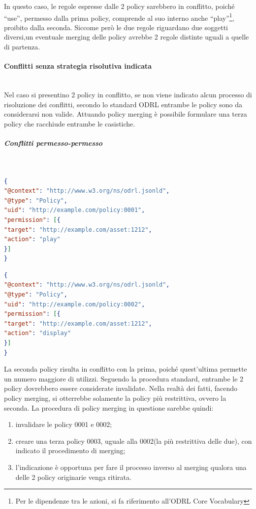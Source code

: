 \documentclass[12pt,a4paper,twoside]{book}
\begin{document}
In questo caso, le regole espresse dalle 2 policy sarebbero in conflitto, poiché ``use'', permesso dalla prima policy, comprende al suo interno anche ``play''\footnote{Per le dipendenze tra le azioni, si fa riferimento all'ODRL Core Vocabulary}, proibito dalla seconda. Siccome però le due regole riguardano due soggetti diversi,un eventuale merging delle policy avrebbe 2 regole distinte uguali a quelle di partenza.
\paragraph{Conflitti senza strategia risolutiva indicata}\label{noStrat}\mbox{}\\
Nel caso si presentino 2 policy in conflitto, se non viene indicato alcun processo di risoluzione dei conflitti, secondo lo standard ODRL entrambe le policy sono da considerarsi non valide. Attuando policy merging è possibile formulare una terza policy che racchiude entrambe le casistiche.
\subparagraph{Conflitti permesso-permesso}\label{permperm}\mbox{}\\
\begin{lstlisting}[language=json,firstnumber=1,caption={La policy 0001 permette un qualsiasi utilizzo dell'asset 1212 a chiunque},captionpos=b]
{
"@context": "http://www.w3.org/ns/odrl.jsonld",
"@type": "Policy",
"uid": "http://example.com/policy:0001",
"permission": [{
"target": "http://example.com/asset:1212",
"action": "play"
}]
}
\end{lstlisting}
\begin{lstlisting}[language=json,firstnumber=1,caption={La policy 0002 permette la riproduzione dell'asset 1212 a chiunque},captionpos=b]
{
"@context": "http://www.w3.org/ns/odrl.jsonld",
"@type": "Policy",
"uid": "http://example.com/policy:0002",
"permission": [{
"target": "http://example.com/asset:1212",
"action": "display"
}]
}
\end{lstlisting}
La seconda policy risulta in conflitto con la prima, poiché quest'ultima permette un numero maggiore di utilizzi. Seguendo la procedura standard, entrambe le 2 policy dovrebbero essere considerate invalidate. Nella realtà dei fatti, facendo policy merging, si otterrebbe solamente la policy più restrittiva, ovvero la seconda. La procedura di policy merging in questione sarebbe quindi: 
\begin{enumerate}
	\item invalidare le policy 0001 e 0002;
	\item creare una terza policy 0003, uguale alla 0002(la più restrittiva delle due), con indicato il procedimento di merging;
	\item l'indicazione è opportuna per fare il processo inverso al merging qualora una delle 2 policy originarie venga ritirata.
\end{enumerate}
\end{document}
